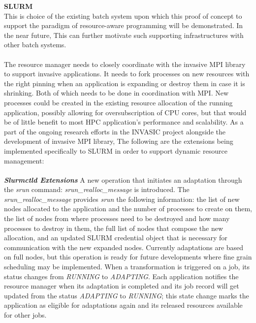 \textbf{SLURM}\\
This is choice of the existing batch system upon which this proof of concept to support the paradigm of resource-aware programming will be demonstrated. In the near future, This can further motivate such supporting infrastructures with other batch systems.\\ \\
\noindent
The resource manager needs to closely coordinate with the invasive MPI library to support invasive applications. It needs to fork processes on new resources with the right pinning when an application is expanding or destroy them in case it is shrinking. Both of which needs to be done in coordination with MPI. New processes could be created in the existing resource allocation of the running application, possibly allowing for oversubscription of CPU cores, but that would be of little benefit to most HPC application's performance and scalability. As a part of the ongoing research efforts in the INVASIC project alongside the development of invasive MPI library, The following are the extensions being implemented specifically to SLURM in order to support dynamic resource management:\\ \\
\textbf{\textit{Slurmctld Extensions}} A new operation that initiates an adaptation through the \textit{srun} command: \textit{srun{\_}realloc{\_}message} is introduced. The \textit{srun{\_}realloc{\_}message} provides \textit{srun} the following information: the list of new nodes allocated to the application and the number of processes to create on them, the list of nodes from where processes need to be destroyed and how many processes to destroy in them, the full list of nodes that compose the new allocation, and an updated SLURM credential object that is necessary for communication with the new expanded nodes. Currently adaptations are based on full nodes, but this operation is ready for future developments where fine grain scheduling may be implemented. When a transformation is triggered on a job, its status changes from \textit{RUNNING} to \textit{ADAPTING}. Each application notifies the resource manager when its adaptation is completed and its job record will get updated from the status \textit{ADAPTING} to \textit{RUNNING}; this state change marks the application as eligible for adaptations again and its released resources available for other jobs.
